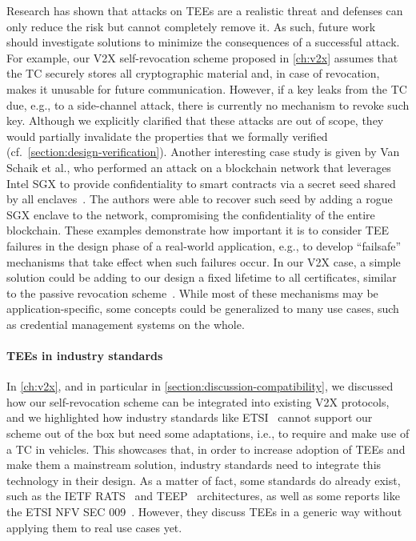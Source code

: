 Research has shown that attacks on \acp{TEE} are a realistic threat and defenses
can only reduce the risk but cannot completely remove it. As such, future work
should investigate solutions to minimize the consequences of a successful
attack. For example, our \ac{V2X} self-revocation scheme proposed in
\cref{ch:v2x} assumes that the \ac{TC} securely stores all cryptographic
material and, in case of revocation, makes it unusable for future communication.
However, if a key leaks from the \ac{TC} due, e.g., to a side-channel attack,
there is currently no mechanism to revoke such key. Although we explicitly
clarified that these attacks are out of scope, they would partially invalidate
the properties that we formally verified
(cf.~\cref{section:design-verification}). Another interesting case study is
given by Van Schaik et al., who performed an attack on a blockchain network that
leverages Intel \ac{SGX} to provide confidentiality to smart contracts via a
secret seed shared by all enclaves~\cite{schaik2024sgxsok}. The authors were
able to recover such seed by adding a rogue \ac{SGX} enclave to the network,
compromising the confidentiality of the entire blockchain. These examples
demonstrate how important it is to consider \ac{TEE} failures in the design
phase of a real-world application, e.g., to develop ``failsafe'' mechanisms that
take effect when such failures occur. In our \ac{V2X} case, a simple solution
could be adding to our design a fixed lifetime to all certificates, similar to
the passive revocation scheme~\cite{etsi2022102941}. While most of these
mechanisms may be application-specific, some concepts could be generalized to
many use cases, such as credential management systems on the whole.

\paragraph{TEEs in industry standards}

In \cref{ch:v2x}, and in particular in \cref{section:discussion-compatibility},
we discussed how our self-revocation scheme can be integrated into existing
\ac{V2X} protocols, and we highlighted how industry standards like
ETSI~\cite{etsi2022102941} cannot support our scheme out of the box but need
some adaptations, i.e., to require and make use of a \ac{TC} in vehicles. This
showcases that, in order to increase adoption of \acp{TEE} and make them a
mainstream solution, industry standards need to integrate this technology in
their design. As a matter of fact, some standards do already exist, such as the
IETF \ac{RATS}~\cite{ietfRats} and \ac{TEEP}~\cite{ietfTeep} architectures, as
well as some reports like the ETSI NFV SEC 009~\cite{etsiNFVSecurity}. However,
they discuss \acp{TEE} in a generic way without applying them to real use cases
yet.

